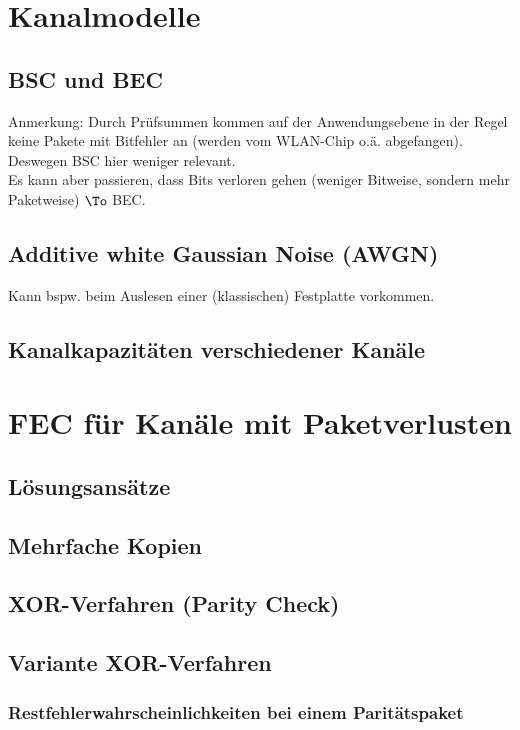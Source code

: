 \section{Kanalmodelle}
\subsection{BSC und BEC}
Anmerkung: Durch Prüfsummen kommen auf der Anwendungsebene in der Regel keine Pakete mit Bitfehler an (werden vom WLAN-Chip o.ä. abgefangen). Deswegen BSC hier weniger relevant.\\
Es kann aber passieren, dass Bits verloren gehen (weniger Bitweise, sondern mehr Paketweise) $\To$ BEC.
\subsection{Additive white Gaussian Noise (AWGN)}
Kann bspw. beim Auslesen einer (klassischen) Festplatte vorkommen.
\subsection{Kanalkapazitäten verschiedener Kanäle}

\section{FEC für Kanäle mit Paketverlusten}
\subsection{Lösungsansätze}
\subsection{Mehrfache Kopien}
\subsection{XOR-Verfahren (Parity Check)}
\subsection{Variante XOR-Verfahren}
\subsubsection{Restfehlerwahrscheinlichkeiten bei einem Paritätspaket}
